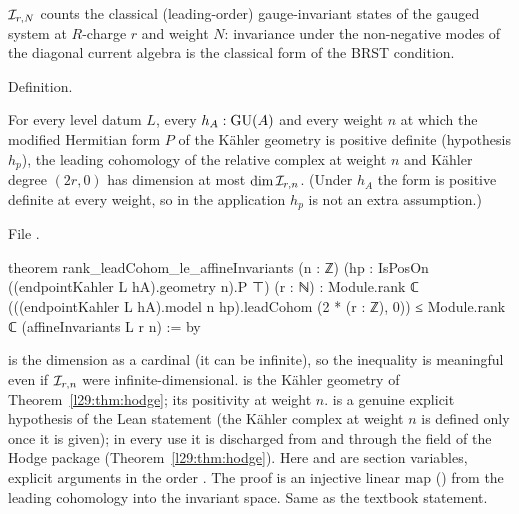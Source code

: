 \begin{physics}
$\mathcal I_{r,N}$ counts the classical (leading-order) gauge-invariant states of the gauged system at
$R$-charge $r$ and weight $N$: invariance under the non-negative modes of the diagonal current algebra is the
classical form of the BRST condition.
\end{physics}

\begin{status}
Definition.
\end{status}

\begin{theorem}\label{l29:thm:koszul}
For every level datum $L$, every $h_A:\mathrm{GU}(A)$ and every weight $n$ at which the modified Hermitian form $P$ of the
Kähler geometry is positive definite (hypothesis $h_p$), the leading cohomology of the relative complex at weight $n$ and Kähler
degree $(2r,0)$ has dimension at most $\dim\mathcal I_{r,n}$. (Under $h_A$ the form is positive definite at every weight, so in the
application $h_p$ is not an extra assumption.)
\end{theorem}

\noindent File .
\begin{leancode}
theorem rank_leadCohom_le_affineInvariants (n : ℤ)
    (hp : IsPosOn ((endpointKahler L hA).geometry n).P ⊤) (r : ℕ) :
    Module.rank ℂ (((endpointKahler L hA).model n hp).leadCohom (2 * (r : ℤ), 0)) ≤
      Module.rank ℂ (affineInvariants L r n) := by
\end{leancode}

\begin{dictionary}
 is the dimension as a cardinal (it can be infinite), so the inequality is meaningful even if
$\mathcal I_{r,n}$ were infinite-dimensional.  is the Kähler geometry of
Theorem~\ref{l29:thm:hodge};  its positivity at weight $n$.  is a genuine explicit hypothesis of the Lean
statement (the Kähler complex at weight $n$ is defined only once it is given); in every use it is discharged from 
and  through the  field of the Hodge package (Theorem~\ref{l29:thm:hodge}). Here
 and  are section variables, explicit arguments in the order . The proof is an injective linear map
() from the leading cohomology into the invariant space. Same as the textbook statement.
\end{dictionary}

